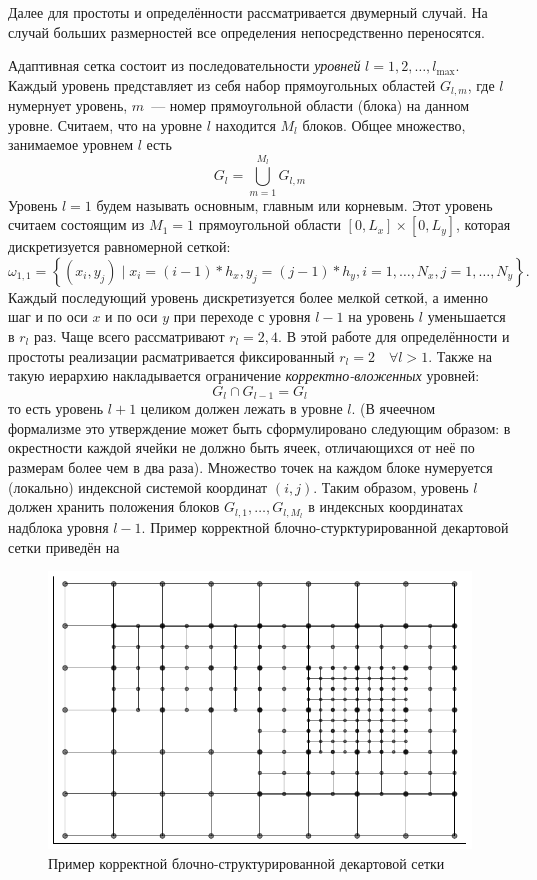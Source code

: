 Далее для простоты и определённости рассматривается двумерный случай.
На случай больших размерностей все определения непосредственно переносятся.

Адаптивная сетка состоит из последовательности \emph{уровней} $l = 1, 2, \ldots, l_{\text{max}}$.
Каждый уровень представляет из себя набор прямоугольных областей $G_{l, m}$, где $l$ нумернует уровень, $m$~--- номер прямоугольной области (блока) на данном уровне.
Считаем, что на уровне $l$ находится $M_l$ блоков.
Общее множество, занимаемое уровнем $l$ есть
\begin{equation*}
    G_{l} = \bigcup_{m = 1}^{M_{l}} G_{l, m}
\end{equation*}
Уровень $l = 1$ будем называть основным, главным или корневым.
Этот уровень считаем состоящим из $M_{1} = 1$ прямоугольной области $[0, L_x] \times [0, L_y]$, которая дискретизуется равномерной сеткой:
\begin{equation*}
    \omega_{1, 1} = \left\{ (x_i, y_j) \mid x_i = (i - 1) * h_x, y_j = (j - 1) * h_y, i = 1, \ldots, N_x, j = 1, \ldots, N_y \right\}.
\end{equation*}
Каждый последующий уровень дискретизуется более мелкой сеткой, а именно шаг и по оси $x$ и по оси $y$ при переходе с уровня $l - 1$ на уровень $l$ уменьшается в $r_{l}$ раз.
Чаще всего рассматривают $r_{l} = 2, 4$.
В этой работе для определённости и простоты реализации расматривается фиксированный $r_l = 2 \quad \forall l > 1$.
Также на такую иерархию накладывается ограничение \emph{корректно-вложенных} уровней:
\begin{equation*}
    G_{l} \cap G_{l - 1} = G_{l}
\end{equation*}
то есть уровень $l + 1$ целиком должен лежать в уровне $l$.
(В ячеечном формализме это утверждение может быть сформулировано следующим образом: в окрестности каждой ячейки не должно быть ячеек, отличающихся от неё по размерам более чем в два раза).
Множество точек на каждом блоке нумеруется (локально) индексной системой координат $(i, j)$.
Таким образом, уровень $l$ должен хранить положения блоков $G_{l, 1}, \ldots, G_{l, M_{l}}$ в индексных координатах надблока уровня $l - 1$.
Пример корректной блочно-стурктурированной декартовой сетки приведён на 
\begin{figure}
    \centering
    \includegraphics{Теория_блочных_локально_адаптивных_сеток/Топология_сетки/grid_topology.pdf}
    \caption{Пример корректной блочно-структурированной декартовой сетки}
    \label{fig:example_BSG}
\end{figure}
